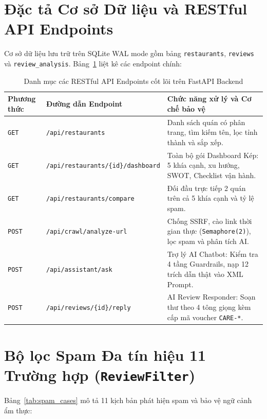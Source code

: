 \documentclass[12pt, a4paper, oneside]{book}
\begin{document}
\section{Đặc tả Cơ sở Dữ liệu và RESTful API Endpoints}
Cơ sở dữ liệu lưu trữ trên SQLite WAL mode gồm bảng \texttt{restaurants}, \texttt{reviews} và \texttt{review\_analysis}. Bảng~\ref{tab:api_endpoints} liệt kê các endpoint chính:

\begin{table}[H]
\centering
\caption{Danh mục các RESTful API Endpoints cốt lõi trên FastAPI Backend}
\label{tab:api_endpoints}
\vspace{0.15cm}
\footnotesize
\begin{tabularx}{\textwidth}{l l X}
\toprule
\rowcolor{blue!8}
\textbf{Phương thức} & \textbf{Đường dẫn Endpoint} & \textbf{Chức năng xử lý và Cơ chế bảo vệ} \\
\midrule
\texttt{GET} & \texttt{/api/restaurants} & Danh sách quán có phân trang, tìm kiếm tên, lọc tỉnh thành và sắp xếp. \\
\texttt{GET} & \texttt{/api/restaurants/\{id\}/dashboard} & Toàn bộ gói Dashboard Kép: 5 khía cạnh, xu hướng, SWOT, Checklist vận hành. \\
\texttt{GET} & \texttt{/api/restaurants/compare} & Đối đầu trực tiếp 2 quán trên cả 5 khía cạnh và tỷ lệ spam. \\
\texttt{POST} & \texttt{/api/crawl/analyze-url} & Chống SSRF, cào link thời gian thực (\texttt{Semaphore(2)}), lọc spam và phân tích AI. \\
\texttt{POST} & \texttt{/api/assistant/ask} & Trợ lý AI Chatbot: Kiểm tra 4 tầng Guardrails, nạp 12 trích dẫn thật vào XML Prompt. \\
\texttt{POST} & \texttt{/api/reviews/\{id\}/reply} & AI Review Responder: Soạn thư theo 4 tông giọng kèm cấp mã voucher \texttt{CARE-*}. \\
\bottomrule
\end{tabularx}
\end{table}

\section{Bộ lọc Spam Đa tín hiệu 11 Trường hợp (\texttt{ReviewFilter})}
Bảng~\ref{tab:spam_cases} mô tả 11 kịch bản phát hiện spam và bảo vệ ngữ cảnh ẩm thực:
\end{document}
